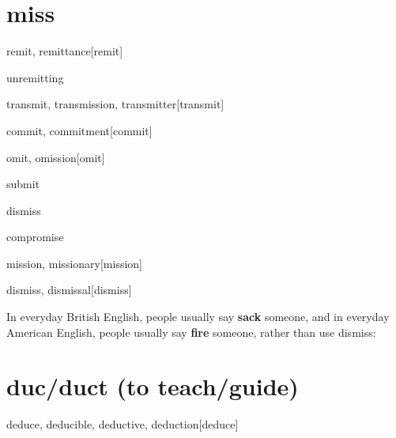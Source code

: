 \section{miss}

\begin{RefWord}{remit, remittance}[remit]
\end{RefWord}

\begin{RefWord}{unremitting}
\end{RefWord}

\begin{RefWord}{transmit, transmission, transmitter}[transmit]
\end{RefWord}

\begin{RefWord}{commit, commitment}[commit]
\end{RefWord}

\begin{RefWord}{omit, omission}[omit]
\end{RefWord}

\begin{RefWord}{submit}
\end{RefWord}

\begin{RefWord}{dismiss}
\end{RefWord}

\begin{RefWord}{compromise}
\end{RefWord}

\begin{RefWord}{mission, missionary}[mission]
\end{RefWord}

\begin{RefWord}{dismiss, dismissal}[dismiss]
\end{RefWord}

\begin{remark}
    In everyday British English, people usually say \textbf{sack} someone, and in everyday American English, people usually say \textbf{fire} someone, rather than use dismiss:
\end{remark}

\section{duc/duct (to teach/guide)}

\begin{RefWord}{deduce, deducible, deductive, deduction}[deduce]
\end{RefWord}

